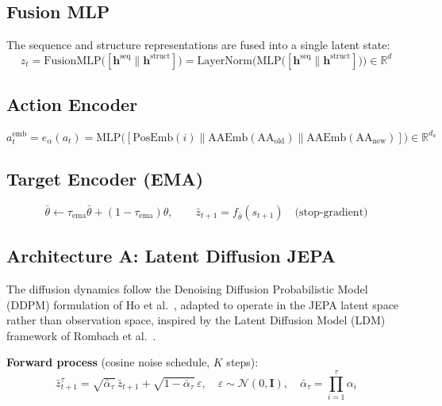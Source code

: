 \documentclass[12pt, a4paper]{article}
\begin{document}
\subsection{Fusion MLP}

The sequence and structure representations are fused into a single latent state:
\begin{equation}
    z_t = \text{FusionMLP}\big([\mathbf{h}^\text{seq} \| \mathbf{h}^\text{struct}]\big) = \text{LayerNorm}\Big(\text{MLP}\big([\mathbf{h}^\text{seq} \| \mathbf{h}^\text{struct}]\big)\Big) \in \mathbb{R}^d
\end{equation}

\subsection{Action Encoder}

\begin{equation}
    a_t^\text{emb} = e_\alpha(a_t) = \text{MLP}\Big([\text{PosEmb}(i) \| \text{AAEmb}(\text{AA}_\text{old}) \| \text{AAEmb}(\text{AA}_\text{new})]\Big) \in \mathbb{R}^{d_a}
\end{equation}

\subsection{Target Encoder (EMA)}

\begin{equation}
    \bar{\theta} \leftarrow \tau_\text{ema} \bar{\theta} + (1 - \tau_\text{ema})\theta, \qquad \bar{z}_{t+1} = f_{\bar{\theta}}(s_{t+1}) \quad \text{(stop-gradient)}
\end{equation}

\subsection{Architecture A: Latent Diffusion JEPA}

The diffusion dynamics follow the Denoising Diffusion Probabilistic Model (DDPM) formulation of Ho et al.\ \citep{ho2020ddpm}, adapted to operate in the JEPA latent space rather than observation space, inspired by the Latent Diffusion Model (LDM) framework of Rombach et al.\ \citep{rombach2022ldm}.

\noindent \textbf{Forward process} (cosine noise schedule, $K$ steps):
\begin{equation}
    \bar{z}_{t+1}^{\tau} = \sqrt{\bar{\alpha}_\tau}\, \bar{z}_{t+1} + \sqrt{1 - \bar{\alpha}_\tau}\, \varepsilon, \quad \varepsilon \sim \mathcal{N}(0, \mathbf{I}), \quad \bar{\alpha}_\tau = \textstyle\prod_{i=1}^{\tau} \alpha_i
\end{equation}
\end{document}
